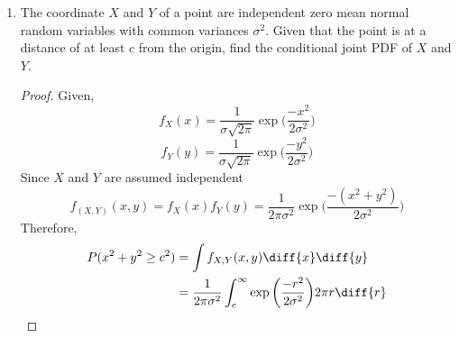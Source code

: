 \documentclass[paper=usletter, fontsize=12pt]{article}
\begin{document}
\begin{enumerate}
\begin{proof}
            The expectations of the exponential distributions, $1/\lambda$,
            \begin{align*}
                E[A] & = 5\\
                E[B] & = 6.5\\
                E[C] & = 10
            \end{align*}
            Given the ratio of the units is $6:2:1$,
            \begin{align*}
                P(A) & = \frac{6}{9}\\
                P(B) & = \frac{2}{9}\\
                P(C) & = \frac{1}{9}
            \end{align*}
            Therefore, the expected lifetime of a unit purchased at random,
            \begin{align*}
                E & = \frac{5 \times 6}{9} + \frac{6.5 \times 2}{9} + \frac{10 \times 1}{9}\\
                & = \frac{53}{6} \qedhere
            \end{align*}
            \endgroup

        \end{proof}

        \item The coordinate $X$ and $Y$ of a point are independent zero mean
        normal random variables with common variances $\sigma^2$. Given that
        the point is at a distance of at least $c$ from the origin, find the
        conditional joint PDF of $X$ and $Y$.
        \begin{proof}

            Given,
            \begin{equation*}
                f_X(x)={\frac{1}{\sigma\sqrt{2\pi}}}\exp\bigg(\frac{-x^2}{2\sigma^2}\bigg)
            \end{equation*}
            \begin{equation*}
                f_Y(y)={\frac{1}{\sigma\sqrt{2\pi}}}\exp\bigg(\frac{-y^2}{2\sigma^2}\bigg)
            \end{equation*}
            Since $X$ and $Y$ are assumed independent
            \begin{equation*}
                f_{(X,Y)}(x,y)=f_X(x)f_Y(y) = \frac{1}{2\pi\sigma^2}\exp\bigg(\frac{-(x^2+y^2)}{2\sigma^2}\bigg)
            \end{equation*}
            Therefore,
            \begin{align*}
                P(x^2+y^2 \ge c^2) & = \int f_{X,Y}(x,y)\diff{x}\diff{y}\\
                & = \frac{1}{2\pi\sigma^2} \int_{c}^{\infty}\exp\bigg(\frac{-r^2}{2\sigma^2}\bigg)2\pi r\diff{r} \qedhere
            \end{align*}
            \endgroup


\end{proof}
\end{enumerate}
\end{document}
